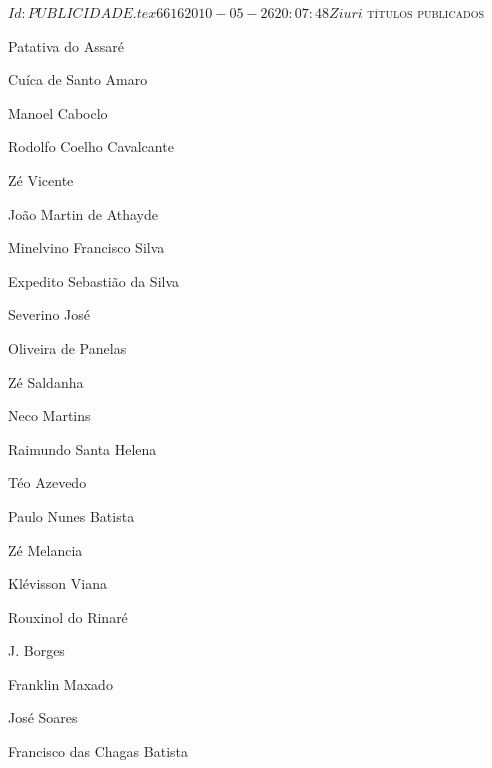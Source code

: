 \SVN $Id: PUBLICIDADE.tex 6616 2010-05-26 20:07:48Z iuri $ 
\pagebreak
\pagestyle{empty}
\textsc{títulos publicados}
\begin{enumerate}
\setlength\itemsep{0.1mm}
{
\def\normalsize{\fontsize{7}{7}\selectfont}\normalsize
\item Patativa do Assaré
\item Cuíca de Santo Amaro
\item Manoel Caboclo
\item Rodolfo Coelho Cavalcante
\item Zé Vicente
\item João Martin de Athayde
\item Minelvino Francisco Silva
\item Expedito Sebastião da Silva
\item Severino José
\item Oliveira de Panelas
\item Zé Saldanha
\item Neco Martins
\item Raimundo Santa Helena
\item Téo Azevedo
\item Paulo Nunes Batista
\item Zé Melancia
\item Klévisson Viana
\item Rouxinol do Rinaré
\item J. Borges
\item Franklin Maxado
\item José Soares
\item Francisco das Chagas Batista
\vfill
}%
\end{enumerate}

